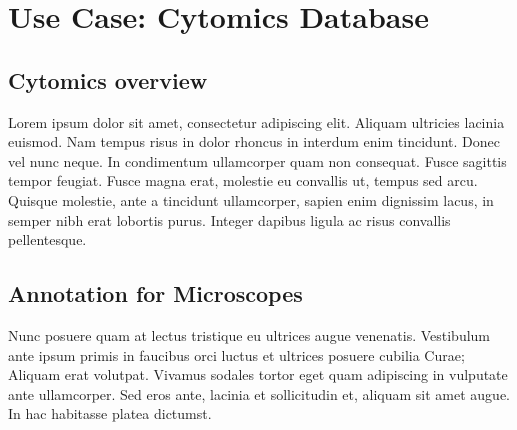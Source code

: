 
\chapter{Use Case: Cytomics Database} %

\label{Chapter5} %



\section{Cytomics overview}

Lorem ipsum dolor sit amet, consectetur adipiscing elit. Aliquam
ultricies lacinia euismod. Nam tempus risus in dolor rhoncus in
interdum enim tincidunt. Donec vel nunc neque. In condimentum
ullamcorper quam non consequat. Fusce sagittis tempor feugiat. Fusce
magna erat, molestie eu convallis ut, tempus sed arcu. Quisque
molestie, ante a tincidunt ullamcorper, sapien enim dignissim lacus,
in semper nibh erat lobortis purus. Integer dapibus ligula ac risus
convallis pellentesque.


\section{Annotation for Microscopes}

Nunc posuere quam at lectus tristique eu ultrices augue
venenatis. Vestibulum ante ipsum primis in faucibus orci luctus et
ultrices posuere cubilia Curae; Aliquam erat volutpat. Vivamus sodales
tortor eget quam adipiscing in vulputate ante ullamcorper. Sed eros
ante, lacinia et sollicitudin et, aliquam sit amet augue. In hac
habitasse platea dictumst.


